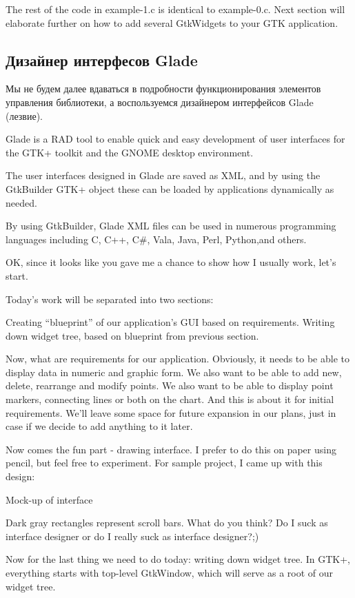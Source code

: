 \documentclass[a4paper,openany,twoside,final]{book}
\begin{document}
The rest of the code in example-1.c is identical to example-0.c. Next section will elaborate further on how to add several GtkWidgets to your GTK application.

\subsection{Дизайнер интерфесов Glade}
\label{sec:glade}

Мы не будем далее вдаваться в подробности функционирования элементов управления библиотеки, а воспользуемся дизайнером интерфейсов Glade (лезвие).

Glade is a RAD tool to enable quick and easy development of user interfaces for the GTK+ toolkit and the GNOME desktop environment.

The user interfaces designed in Glade are saved as XML, and by using the GtkBuilder GTK+ object these can be loaded by applications dynamically as needed.

By using GtkBuilder, Glade XML files can be used in numerous programming languages including C, C++, C\#, Vala, Java, Perl, Python,and others.

OK, since it looks like you gave me a chance to show how I usually work, let's start.

Today's work will be separated into two sections:

    Creating ``blueprint'' of our application's GUI based on requirements.
    Writing down widget tree, based on blueprint from previous section.

Now, what are requirements for our application. Obviously, it needs to be able to display data in numeric and graphic form. We also want to be able to add new, delete, rearrange and modify points. We also want to be able to display point markers, connecting lines or both on the chart. And this is about it for initial requirements. We'll leave some space for future expansion in our plans, just in case if we decide to add anything to it later.

Now comes the fun part - drawing interface. I prefer to do this on paper using pencil, but feel free to experiment. For sample project, I came up with this design:

Mock-up of interface

Dark gray rectangles represent scroll bars. What do you think? Do I suck as interface designer or do I really suck as interface designer?;)

Now for the last thing we need to do today: writing down widget tree. In GTK+, everything starts with top-level GtkWindow, which will serve as a root of our widget tree.
\end{document}
